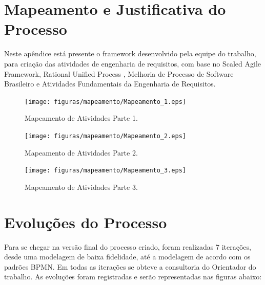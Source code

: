 \begin{apendicesenv}

\partapendices

\chapter{Mapeamento e Justificativa do Processo }\label{apendice:mapeamento}

Neste apêndice está presente o framework desenvolvido pela equipe do trabalho, para criação das atividades de engenharia de requisitos,
com base no Scaled Agile Framework, Rational Unified Process , Melhoria de Processo de Software Brasileiro e Atividades Fundamentais da Engenharia de Requisitos.


\begin{figure}[H]
    \centering
	\texttt{[image: figuras/mapeamento/Mapeamento\_1.eps]}
    \caption{Mapeamento de Atividades Parte 1.}
    \label{fig:processo}
\end{figure}

\begin{figure}[H]
    \centering
	\texttt{[image: figuras/mapeamento/Mapeamento\_2.eps]}
    \caption{Mapeamento de Atividades Parte 2.}
    \label{fig:processo}
\end{figure}

\begin{figure}[H]
    \centering
	\texttt{[image: figuras/mapeamento/Mapeamento\_3.eps]}
    \caption{Mapeamento de Atividades Parte 3.}
    \label{fig:processo}
\end{figure}

\chapter{Evoluções do Processo}\label{apendice:evolution}

Para se chegar na versão final do processo criado, foram realizadas 7 iterações, desde uma modelagem de baixa fidelidade, até a
modelagem de acordo com os padrões BPMN. Em todas as iterações se obteve a consultoria do Orientador do trabalho. As evoluções foram registradas e serão representadas nas figuras abaixo:


\end{apendicesenv}
